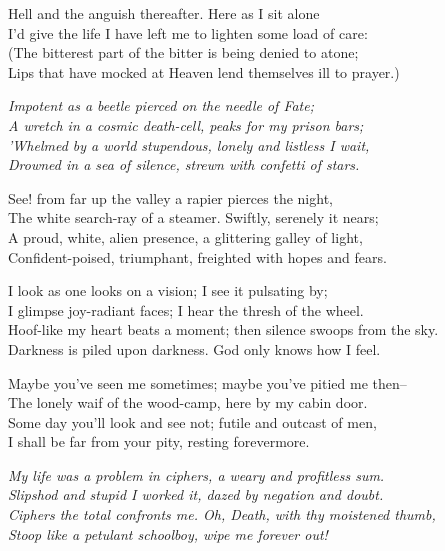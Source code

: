 \begin{poemblock}
Hell and the anguish thereafter.  Here as I sit alone\\
\idt I'd give the life I have left me to lighten some load of care:\\
(The bitterest part of the bitter is being denied to atone;\\
\idt Lips that have mocked at Heaven lend themselves ill to prayer.)

\indentedblock\itshape{
Impotent as a beetle pierced on the needle of Fate;\\
\idt A wretch in a cosmic death-cell, peaks for my prison bars;\\
'Whelmed by a world stupendous, lonely and listless I wait,\\
\idt Drowned in a sea of silence, strewn with confetti of stars.
}

See! from far up the valley a rapier pierces the night,\\
\idt The white search-ray of a steamer.  Swiftly, serenely it nears;\\
A proud, white, alien presence, a glittering galley of light,\\
\idt Confident-poised, triumphant, freighted with hopes and fears.

I look as one looks on a vision; I see it pulsating by;\\
\idt I glimpse joy-radiant faces; I hear the thresh of the wheel.\\
Hoof-like my heart beats a moment; then silence swoops from the sky.\\
\idt Darkness is piled upon darkness.  God only knows how I feel.

Maybe you've seen me sometimes; maybe you've pitied me then--\\
\idt The lonely waif of the wood-camp, here by my cabin door.\\
Some day you'll look and see not; futile and outcast of men,\\
\idt I shall be far from your pity, resting forevermore.

\indentedblock\itshape{
My life was a problem in ciphers, a weary and profitless sum.\\
\idt Slipshod and stupid I worked it, dazed by negation and doubt.\\
Ciphers the total confronts me.  Oh, Death, with thy moistened thumb,\\
\idt Stoop like a petulant schoolboy, wipe me forever out!
}
\end{poemblock}

